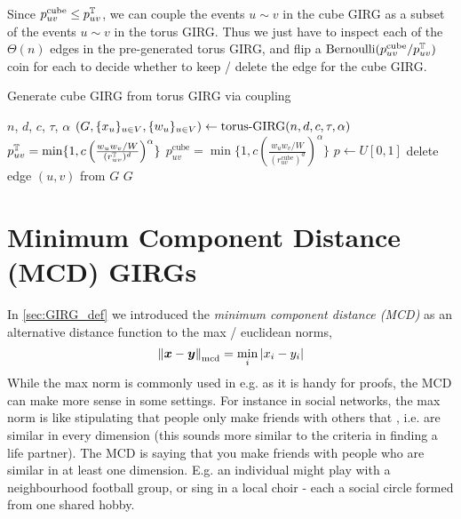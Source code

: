 Since $p_{uv}^\text{cube} \leq p_{uv}^{\mathbb{T}}$, we can couple the events $u \sim v$ in the cube GIRG as a subset of the events $u \sim v$ in the torus GIRG. Thus we just have to inspect each of the $\Theta(n)$ edges in the pre-generated torus GIRG, and flip a $\operatorname{Bernoulli}(p_{uv}^\text{cube} / p_{uv}^{\mathbb{T}})$ coin for each to decide whether to keep / delete the edge for the cube GIRG.

\begin{algorithm}
    \caption{Generate cube GIRG from torus GIRG via coupling}\label{alg:cube_coupling}
    \begin{algorithmic}
    \Require $n$, $d$, $c$, $\tau$, $\alpha$
    \State $\left ( G, \{x_u\}_{u \in V}, \{w_u\}_{u \in V} \right ) \gets \text{torus-}\mathrm{GIRG}(n,d,c,\tau, \alpha)$
        \State $p_{uv}^{\mathbb{T}} = \min \{1, c \left (
            \frac{w_u w_v / W}{(r_{uv}^{\mathbb{T}})^d} \right )^\alpha \}$
        \State $p_{uv}^\text{cube} = \min \{1, c \left (
            \frac{w_u w_v / W}{(r_{uv}^\text{cube})^d} \right )^\alpha \}$
        \State $p \gets U[0,1]$
            \State delete edge $(u,v)$ from $G$
        \EndIf
    \EndFor
    \State \Return $G$
\end{algorithmic}
\end{algorithm}




\section{Minimum Component Distance (MCD) GIRGs}
In \cref{sec:GIRG_def} we introduced the \textit{minimum component distance (MCD)} as an alternative distance function to the max / euclidean norms,
\begin{equation}
    \left\lVert \bm{x} - \bm{y}\right\rVert_{\mathrm{mcd}} = \min_i |x_i - y_i|
\end{equation}
While the max norm is commonly used in e.g. \cite{bringmann2019geometric} as it is handy for proofs, the MCD can make more sense in some settings. For instance in social networks, the max norm is like stipulating that people only make friends with others that , i.e. are similar in every dimension (this sounds more similar to the criteria in finding a life partner). The MCD is saying that you make friends with people who are similar in at least one dimension. E.g. an individual might play with a neighbourhood football group, or sing in a local choir - each a social circle formed from one shared hobby.

